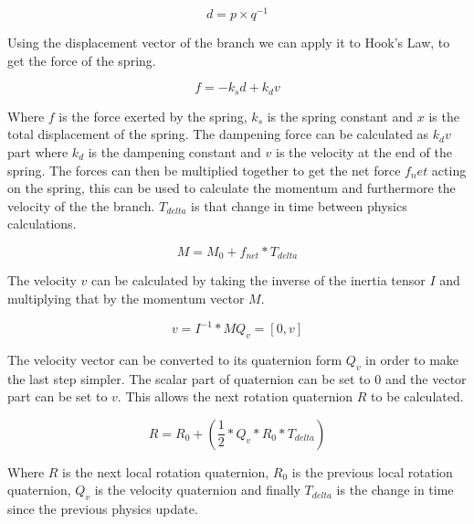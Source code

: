 \begin{equation}
d = p \times q^{-1}
\end{equation}

\noindent
Using the displacement vector of the branch we can apply it to Hook's Law, to get the force of the spring. 

\begin{equation}
f = -k _s d + k _d v
\end{equation}

\noindent
Where $f$ is the force exerted by the spring, $k _s$ is the spring constant and $x$ is the total displacement of the spring. The dampening force can be calculated as $k _d v$ part where $k _d$ is the dampening constant and $v$ is the velocity at the end of the spring. The forces can then be multiplied together to get the net force $f_net$ acting on the spring, this can be used to calculate the momentum and furthermore the velocity of the the branch. $T_{delta}$ is that change in time between physics calculations.

\begin{equation}
M = M_0 + f_{net} * T_{delta}
\end{equation}

\noindent
The velocity $v$ can be calculated by taking the inverse of the inertia tensor $I$ and multiplying that by the momentum vector $M$.

\begin{equation}
v = I^{-1} * M
Q_v = [0, v]
\end{equation}

\noindent
The velocity vector can be converted to its quaternion form $Q_v$ in order to make the last step simpler. The scalar part of quaternion can be set to 0 and the vector part can be set to $v$. This allows the next rotation quaternion $R$ to be calculated. 

\begin{equation}
R = R_0 + (\frac{1}{2} * Q_v * R_0 * T_{delta})
\end{equation}

\noindent
Where $R$ is the next local rotation quaternion, $R_0$ is the previous local rotation quaternion, $Q_v$ is the velocity quaternion and finally $T_{delta}$ is the change in time since the previous physics update.

